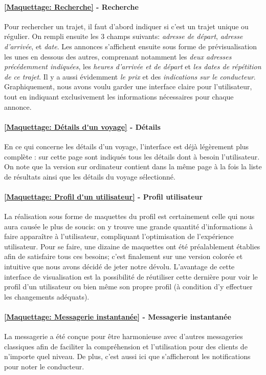 \paragraph{\ref{Maquettage: Recherche} -  Recherche}
Pour rechercher un trajet, il faut d'abord indiquer si c'est un trajet unique ou régulier. On rempli ensuite les 3 champs suivants: \textit{adresse de départ}, \textit{adresse d'arrivée}, et \textit{date}. Les annonces s'affichent ensuite sous forme de prévisualisation les unes en dessous des autres, comprenant notamment les \textit{deux adresses précédemment indiquées}, les \textit{heures d'arrivée et de départ} et \textit{les dates de répétition de ce trajet}. Il y a aussi évidemment \textit{le prix} et des \textit{indications sur le conducteur}. Graphiquement, nous avons voulu garder une interface claire pour l'utilisateur, tout en indiquant exclusivement les informations nécessaires pour chaque annonce. 

\paragraph{\ref{Maquettage: Détails d'un voyage} - Détails}
En ce qui concerne les détails d'un voyage, l'interface est déjà légèrement plus complète : sur cette page sont indiqués tous les détails dont à besoin l'utilisateur.
On note que la version sur ordinateur contient dans la même page à la fois la liste de résultats ainsi que les détails du voyage sélectionné.

\paragraph{\ref{Maquettage: Profil d'un utilisateur} - Profil utilisateur}
La réalisation sous forme de maquettes du profil est certainement celle qui nous aura causée le plus de soucis: on y trouve une grande quantité d'informations à faire apparaître à l'utilisateur, compliquant l'optimisation de l'expérience utilisateur. Pour se faire, une dizaine de maquettes ont été préalablement établies afin de satisfaire tous ces besoins; c'est finalement sur une version colorée et intuitive que nous avons décidé de jeter notre dévolu. L'avantage de cette interface de visualisation est la possibilité de réutiliser cette dernière pour voir le profil d'un utilisateur ou bien même son propre profil (à condition d'y effectuer les changements adéquats).

\paragraph{\ref{Maquettage: Messagerie instantanée} - Messagerie instantanée}
La messagerie a été conçue pour être harmonieuse avec d'autres messageries classiques afin de faciliter la compréhension et l'utilisation pour des clients de n'importe quel niveau. De plus, c'est aussi ici que s'afficheront les notifications pour noter le conducteur. 

